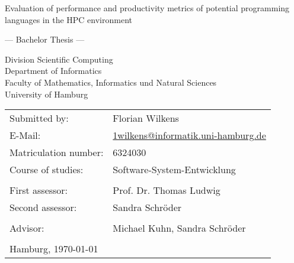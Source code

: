 \documentclass[
	12pt,
	a4paper,
	BCOR10mm,
	DIV14,
	listof=totoc,
	bibliography=totoc,
	headsepline
]{scrreprt}
\begin{document}
\begin{titlepage}
	\begin{center}
		{\titlefont\huge Evaluation of performance and productivity metrics of
			potential programming languages in the HPC environment \par}

		\bigskip
		\bigskip

		{\titlefont\Large --- Bachelor Thesis ---\par}

		\bigskip
		\bigskip

		{\large Division Scientific Computing \\
		Department of Informatics \\
		Faculty of Mathematics, Informatics und Natural Sciences \\
		University of Hamburg\par}
	\end{center}

	\vfill

	{\large \begin{tabular}{ll}
		Submitted by: & Florian Wilkens \\
		E-Mail: & \href{mailto:1wilkens@informatik.uni-hamburg.de}
			{1wilkens@informatik.uni-hamburg.de} \\
		Matriculation number: & 6324030 \\
		Course of studies: & Software-System-Entwicklung \\
		\\
		First assessor: & Prof. Dr. Thomas Ludwig \\
		Second assessor: & Sandra Schr\"oder \\ \\
		Advisor: & Michael Kuhn, Sandra Schr\"oder \\
		\\
		Hamburg, \today
	\end{tabular}\par}
\end{titlepage}



\tableofcontents 				  %






\end{document}
